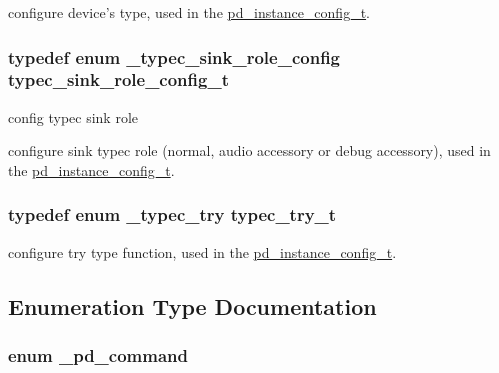 configure device's type, used in the \hyperlink{group__usb__pd__stack_gafa6034f9e204836697da1f2fc996cbad}{pd\-\_\-instance\-\_\-config\-\_\-t}. 

\hypertarget{group__usb__pd__stack_gaa91aa4484c581bbfab49d099b848ccf3}{
\subsubsection[{typec\-\_\-sink\-\_\-role\-\_\-config\-\_\-t}]{\setlength{\rightskip}{0pt plus 5cm}typedef enum {\bf \-\_\-typec\-\_\-sink\-\_\-role\-\_\-config}  {\bf typec\-\_\-sink\-\_\-role\-\_\-config\-\_\-t}}}\label{group__usb__pd__stack_gaa91aa4484c581bbfab49d099b848ccf3}


config typec sink role 

configure sink typec role (normal, audio accessory or debug accessory), used in the \hyperlink{group__usb__pd__stack_gafa6034f9e204836697da1f2fc996cbad}{pd\-\_\-instance\-\_\-config\-\_\-t}. \hypertarget{group__usb__pd__stack_ga86c3c8c95607b75c0c75cd2714487497}{
\subsubsection[{typec\-\_\-try\-\_\-t}]{\setlength{\rightskip}{0pt plus 5cm}typedef enum {\bf \-\_\-typec\-\_\-try}  {\bf typec\-\_\-try\-\_\-t}}}\label{group__usb__pd__stack_ga86c3c8c95607b75c0c75cd2714487497}


configure try type function, used in the \hyperlink{group__usb__pd__stack_gafa6034f9e204836697da1f2fc996cbad}{pd\-\_\-instance\-\_\-config\-\_\-t}. 



\subsection{Enumeration Type Documentation}
\hypertarget{group__usb__pd__stack_gabf2676c3360b7c572954ae09c0a5e46a}{
\subsubsection[{\-\_\-pd\-\_\-command}]{\setlength{\rightskip}{0pt plus 5cm}enum {\bf \-\_\-pd\-\_\-command}}}\label{group__usb__pd__stack_gabf2676c3360b7c572954ae09c0a5e46a}


